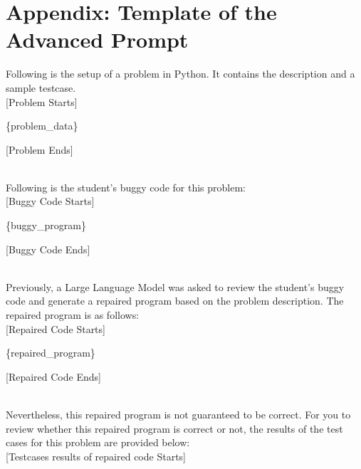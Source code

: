 \documentclass{article}
\begin{document}



\clearpage

\section{Appendix: Template of the Advanced Prompt}\label{appendix:advanced-prompt}

\begin{figure*}[h!]
    \centering
    \begin{tcolorbox}[colframe=black!10!white, colback=black!5!white]
        \begin{minipage}{\textwidth}
            \ttfamily
            Following is the setup of a problem in Python. It contains the description and a sample testcase.\\

            [Problem Starts]

            \{problem\_data\}

            [Problem Ends]

            \texttt{\\}
            Following is the student's buggy code for this problem:\\

            [Buggy Code Starts]

            \{buggy\_program\}

            [Buggy Code Ends]

            \texttt{\\}
            Previously, a Large Language Model was asked to review the student's buggy code and generate a repaired program based on the problem description. The repaired program is as follows:\\

            [Repaired Code Starts]

            \{repaired\_program\}

            [Repaired Code Ends]

            \texttt{\\}
            Nevertheless, this repaired program is not guaranteed to be correct. For you to review whether this repaired program is correct or not, the results of the test cases for this problem are provided below:\\

            [Testcases results of repaired code Starts]


\end{minipage}
\end{tcolorbox}
\end{figure*}
\end{document}
